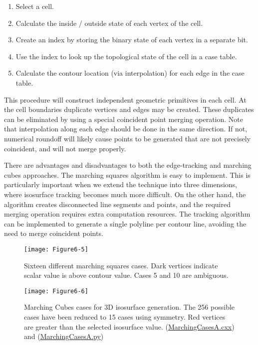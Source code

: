 \begin {enumerate}

\item Select a cell.

\item Calculate the inside / outside state of each vertex of the cell.

\item Create an index by storing the binary state of each vertex in a separate bit.

\item Use the index to look up the topological state of the cell in a case
table.

\item Calculate the contour location (via interpolation) for each edge in  the case table.

\end{enumerate}

This procedure will construct independent geometric primitives in each cell. At the cell boundaries duplicate vertices and edges may be created. These duplicates can be eliminated by using a special coincident point merging operation. Note that interpolation along each edge should be done in the same direction. If not, numerical roundoff will likely cause points to be generated that are not precisely coincident, and will not merge properly.

There are advantages and disadvantages to both the edge-tracking and marching cubes approaches. The marching squares algorithm is easy to implement. This is particularly important when we extend the technique into three dimensions, where isosurface tracking becomes much more difficult. On the other hand, the algorithm creates disconnected line segments and points, and the required merging operation requires extra computation resources. The tracking algorithm can be implemented to generate a single polyline per contour line, avoiding the need to merge coincident points.

\begin{figure}[!htb]
\centering
\texttt{[image: Figure6-5]}\\
\caption{ Sixteen different marching squares cases. Dark vertices indicate scalar value is above contour value. Cases 5 and 10 are ambiguous.}
\label{fig:Figure6-5}
\end{figure}


\begin{figure}[!htb]
	\centering
	\texttt{[image: Figure6-6]}\\
	\caption{Marching Cubes cases for 3D isosurface generation. The 256 possible cases have been reduced to 15 cases using symmetry. Red vertices are greater than the selected isosurface value. (\href{https://lorensen.github.io/VTKExamples/site/Cxx/VisualizationAlgorithms/MarchingCasesA/}{MarchingCasesA.cxx}) and (\href{https://lorensen.github.io/VTKExamples/site/Python/VisualizationAlgorithms/MarchingCasesA/}{MarchingCasesA.py})}
	\label{fig:Figure6-6}
\end{figure}


